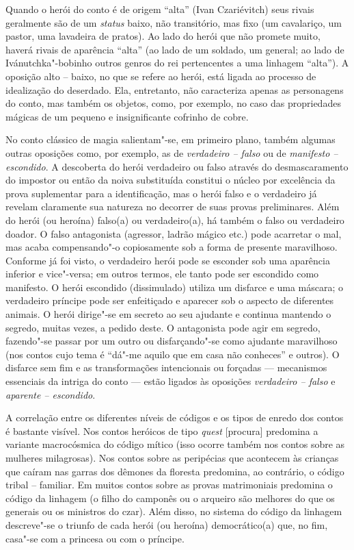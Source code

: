 Quando o herói do conto é de origem ``alta'' (Ivan Czariévitch) seus
rivais geralmente são de um \emph{status} baixo, não transitório, mas fixo
(um cavalariço, um pastor, uma lavadeira de pratos). Ao lado do herói
que não promete muito, haverá rivais de aparência ``alta'' (ao lado de
um soldado, um general; ao lado de Ivánutchka"-bobinho outros genros do
rei pertencentes a uma linhagem ``alta''). A oposição alto -- baixo, no
que se refere ao herói, está ligada ao processo de idealização do
deserdado. Ela, entretanto, não caracteriza apenas as personagens do
conto, mas também os objetos, como, por exemplo, no caso das
propriedades mágicas de um pequeno e insignificante cofrinho de cobre.

No conto clássico de magia salientam"-se, em primeiro plano, também
algumas outras oposições como, por exemplo, as de \emph{verdadeiro --
falso} ou de \emph{manifesto -- escondido}. A descoberta do herói verdadeiro
ou falso através do desmascaramento do impostor ou então da noiva
substituída constitui o núcleo por excelência da prova suplementar para
a identificação, mas o herói falso e o verdadeiro já revelam claramente
sua natureza no decorrer de suas provas preliminares. Além do herói (ou
heroína) falso(a) ou verdadeiro(a), há também o falso ou verdadeiro
doador. O falso antagonista (agressor, ladrão mágico etc.) pode
acarretar o mal, mas acaba compensando"-o copiosamente sob a forma de
presente maravilhoso. Conforme já foi visto, o verdadeiro herói pode se
esconder sob uma aparência inferior e vice"-versa; em outros termos, ele
tanto pode ser escondido como manifesto. O herói escondido (dissimulado)
utiliza um disfarce e uma máscara; o verdadeiro príncipe pode ser
enfeitiçado e aparecer sob o aspecto de diferentes animais. O herói
dirige"-se em secreto ao seu ajudante e continua mantendo o segredo,
muitas vezes, a pedido deste. O antagonista pode agir em segredo,
fazendo"-se passar por um outro ou disfarçando"-se como ajudante
maravilhoso (nos contos cujo tema é ``dá"-me aquilo que em casa não
conheces'' e outros). O disfarce sem fim e as transformações
intencionais ou forçadas --- mecanismos essenciais da intriga do conto ---
estão ligados às oposições \emph{verdadeiro -- falso} e \emph{aparente -- escondido}.

A correlação entre os diferentes níveis de códigos e os tipos de enredo
dos contos é bastante visível. Nos contos heróicos de
tipo \emph{quest} [procura] predomina a variante macrocósmica do código
mítico (isso ocorre também nos contos sobre as mulheres milagrosas). Nos
contos sobre as peripécias que acontecem às crianças que caíram nas
garras dos dêmones da floresta predomina, ao contrário, o código tribal
-- familiar. Em muitos contos sobre as provas matrimoniais predomina o
código da linhagem (o filho do camponês ou o arqueiro são melhores do
que os generais ou os ministros do czar). Além disso, no sistema do
código da linhagem descreve"-se o triunfo de cada herói (ou heroína)
democrático(a) que, no fim, casa"-se com a princesa ou com o príncipe.

